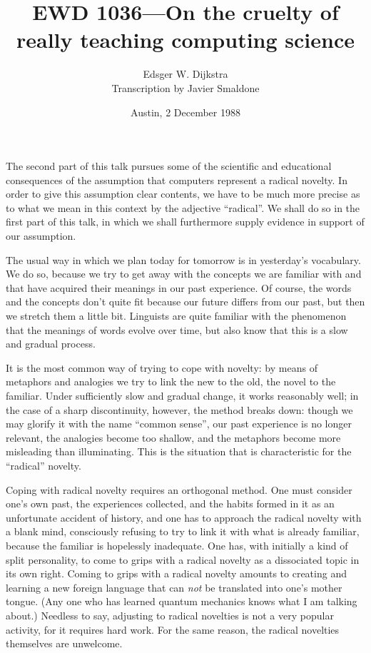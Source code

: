 \documentclass[a4paper,12pt]{article}
\author{Edsger W. Dijkstra\\
Transcription by Javier Smaldone}
\date{Austin, 2 December 1988}
\title{EWD 1036---On the cruelty of really teaching computing science}
\begin{document}
\maketitle




The second part of this talk pursues some of the scientific and
educational consequences of the assumption that computers represent a
radical novelty.  In order to give this assumption clear contents, we
have to be much more precise as to what we mean in this context by the
adjective ``radical''.  We shall do so in the first part of this talk,
in which we shall furthermore supply evidence in support of our
assumption.

The usual way in which we plan today for tomorrow is in yesterday's
vocabulary.  We do so, because we try to get away with the concepts we
are familiar with and that have acquired their meanings in our past
experience.  Of course, the words and the concepts don't quite fit
because our future differs from our past, but then we stretch them a
little bit.  Linguists are quite familiar with the phenomenon that the
meanings of words evolve over time, but also know that this is a slow
and gradual process.

It is the most common way of trying to cope with novelty: by means of
metaphors and analogies we try to link the new to the old, the novel to
the familiar.  Under sufficiently slow and gradual change, it works
reasonably well; in the case of a sharp discontinuity, however, the
method breaks down: though we may glorify it with the name ``common
sense'', our past experience is no longer relevant, the analogies become
too shallow, and the metaphors become more misleading than illuminating.
This is the situation that is characteristic for the ``radical''
novelty.

Coping with radical novelty requires an orthogonal method.  One must
consider one's own past, the experiences collected, and the habits
formed in it as an unfortunate accident of history, and one has to
approach the radical novelty with a blank mind, consciously refusing to
try to link it with what is already familiar, because the familiar is
hopelessly inadequate.  One has, with initially a kind of split
personality, to come to grips with a radical novelty as a dissociated
topic in its own right.  Coming to grips with a radical novelty amounts
to creating and learning a new foreign language that can \emph{not} be
translated into one's mother tongue.  (Any one who has learned quantum
mechanics knows what I am talking about.) Needless to say, adjusting to
radical novelties is not a very popular activity, for it requires hard
work.  For the same reason, the radical novelties themselves are
unwelcome.
\end{document}
